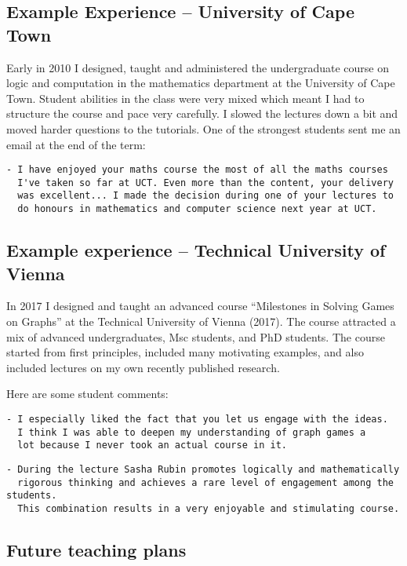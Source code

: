 \documentclass[10,a4paper,sans]{moderncv}
\begin{document}
\subsection{Example Experience -- University of Cape Town}

Early in 2010 I designed, taught and administered the undergraduate course on logic and computation in the mathematics department at the University of Cape Town. Student abilities in the class were very mixed which meant I had to structure the course and pace very carefully. I slowed the lectures down a bit and moved harder questions to the tutorials. One of the strongest students sent me an email at the end of the term:

\begin{verbatim}
- I have enjoyed your maths course the most of all the maths courses 
  I've taken so far at UCT. Even more than the content, your delivery 
  was excellent... I made the decision during one of your lectures to 
  do honours in mathematics and computer science next year at UCT. 
\end{verbatim}

\subsection{Example experience -- Technical University of Vienna}

In 2017 I designed and taught an advanced course ``Milestones in Solving Games on Graphs'' at the Technical University of Vienna (2017). The course attracted a mix of 
advanced undergraduates, Msc students, and PhD students. The course started from first principles, included many motivating examples, and also included lectures on my 
own recently published research.

Here are some student comments:
\begin{verbatim}
- I especially liked the fact that you let us engage with the ideas. 
  I think I was able to deepen my understanding of graph games a 
  lot because I never took an actual course in it.
\end{verbatim}

\begin{verbatim}
- During the lecture Sasha Rubin promotes logically and mathematically 
  rigorous thinking and achieves a rare level of engagement among the students. 
  This combination results in a very enjoyable and stimulating course.
\end{verbatim}

\subsection{Future teaching plans}
\end{document}
